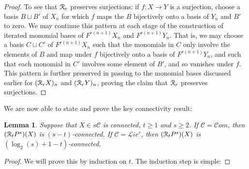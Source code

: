 \documentclass[11pt]{amsart} \renewcommand{\baselinestretch}{1.2}
\theoremstyle{plain}
\newtheorem{lem}[thm]{Lemma}
\theoremstyle{definition}
\renewcommand{\to}{\longrightarrow}
\newcommand{\scrL}{\mathscr{L}}
\newcommand{\scrC}{\mathscr{C}}
\newcommand{\calR}{\mathcal{R}}
\newcommand{\calc}{\mathcal{C}}
\newcommand{\algs}{{\scrC\!\textit{om}}}
\newcommand{\restliealgs}{{\scrL\!\textit{ie}^\textit{r}}}
\newcommand{\algcat}{{\calc}}%
\newcommand{\caldup}[1]{\calR_{\smash{#1}}}
\newcommand{\barConstructionMightAbbreviate}{b}
\begin{document}
\begin{Bousfield-Kan spectral sequence}
\begin{proof}
To see that $\caldup{r}$ preserves surjections: if $f:X\to Y$ is a surjection, choose a basis $B\sqcup B'$ of $X_n$ for  which $f$ maps the $B$ bijectively onto a basis of $Y_n$ and $B'$ to zero. We may continue this pattern at each stage of the construction of iterated monomial bases of $F^{r(n+1)}X_n$ and $F^{r(n+1)}Y_n$. That is, we may choose a  basis $C\sqcup C'$ of $F^{r(n+1)}X_n$  such that the monomials in $C$ only involve the elements of $B$ and map under $f$ bijectively onto a basis of $F^{r(n+1)}Y_n$, and such that each monomial in $C'$ involves some element of $B'$, and so vanishes under $f$. This pattern is further preserved in passing to the monomial bases discussed earlier for $(\caldup{r}X)_n$ and $(\caldup{r}Y)_n$, proving the claim that $\caldup{r}$ preserves surjections. 
%
%
\end{proof}
We are now able to state and prove the key connectivity result:
\begin{lem}
\label{connectivityOfDerivedPowers}
Suppose that $X\in s\algcat$ is connected, $t\geq1$ and $s\geq2$. If $\algcat=\algs$, then $(\caldup{t}P^{s})(X)$ is $(s-t)$-connected. If $\algcat=\restliealgs$, then $(\caldup{t}P^{s})(X)$ is  $(\log_2(s)+1-t)$-connected.
\end{lem}
\begin{proof}
We will prove this by induction on $t$. The induction step is simple: %

\end{proof}
\end{Bousfield-Kan spectral sequence}
\end{document}

